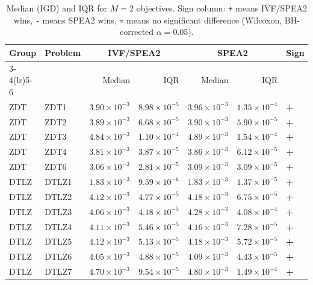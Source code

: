 \begin{table}[t]
\centering
\caption{Median (IGD) and IQR for $M=2$ objectives. Sign column: \texttt{+} means IVF/SPEA2 wins, \texttt{-} means SPEA2 wins, \texttt{=} means no significant difference (Wilcoxon, BH-corrected $\alpha=0.05$).}
\label{tab:igd_m2_ivfspea2}
\scriptsize
\begin{tabular}{llrrrrl}
\toprule
Group & Problem & \multicolumn{2}{c}{IVF/SPEA2} & \multicolumn{2}{c}{SPEA2} & Sign \\
\cmidrule(lr){3-4}\cmidrule(lr){5-6}
 & & Median & IQR & Median & IQR & \\
\midrule
ZDT & ZDT1 & $3.90\!\times\!10^{-3}$ & $8.98\!\times\!10^{-5}$ & $3.96\!\times\!10^{-3}$ & $1.35\!\times\!10^{-4}$ & \textbf{+} \\
ZDT & ZDT2 & $3.89\!\times\!10^{-3}$ & $6.68\!\times\!10^{-5}$ & $3.90\!\times\!10^{-3}$ & $5.90\!\times\!10^{-5}$ & \textbf{+} \\
ZDT & ZDT3 & $4.84\!\times\!10^{-3}$ & $1.10\!\times\!10^{-4}$ & $4.89\!\times\!10^{-3}$ & $1.54\!\times\!10^{-4}$ & \textbf{+} \\
ZDT & ZDT4 & $3.81\!\times\!10^{-3}$ & $3.87\!\times\!10^{-5}$ & $3.86\!\times\!10^{-3}$ & $6.12\!\times\!10^{-5}$ & \textbf{+} \\
ZDT & ZDT6 & $3.06\!\times\!10^{-3}$ & $2.81\!\times\!10^{-5}$ & $3.09\!\times\!10^{-3}$ & $3.09\!\times\!10^{-5}$ & \textbf{+} \\
\addlinespace
DTLZ & DTLZ1 & $1.83\!\times\!10^{-3}$ & $9.59\!\times\!10^{-6}$ & $1.83\!\times\!10^{-3}$ & $1.37\!\times\!10^{-5}$ & \textbf{+} \\
DTLZ & DTLZ2 & $4.12\!\times\!10^{-3}$ & $4.77\!\times\!10^{-5}$ & $4.18\!\times\!10^{-3}$ & $6.75\!\times\!10^{-5}$ & \textbf{+} \\
DTLZ & DTLZ3 & $4.06\!\times\!10^{-3}$ & $4.18\!\times\!10^{-5}$ & $4.28\!\times\!10^{-3}$ & $4.08\!\times\!10^{-4}$ & \textbf{+} \\
DTLZ & DTLZ4 & $4.11\!\times\!10^{-3}$ & $5.46\!\times\!10^{-5}$ & $4.16\!\times\!10^{-3}$ & $7.28\!\times\!10^{-5}$ & \textbf{+} \\
DTLZ & DTLZ5 & $4.12\!\times\!10^{-3}$ & $5.13\!\times\!10^{-5}$ & $4.18\!\times\!10^{-3}$ & $5.72\!\times\!10^{-5}$ & \textbf{+} \\
DTLZ & DTLZ6 & $4.05\!\times\!10^{-3}$ & $4.88\!\times\!10^{-5}$ & $4.09\!\times\!10^{-3}$ & $4.43\!\times\!10^{-5}$ & \textbf{+} \\
DTLZ & DTLZ7 & $4.70\!\times\!10^{-3}$ & $9.54\!\times\!10^{-5}$ & $4.80\!\times\!10^{-3}$ & $1.49\!\times\!10^{-4}$ & \textbf{+} \\

\end{tabular}
\end{table}
